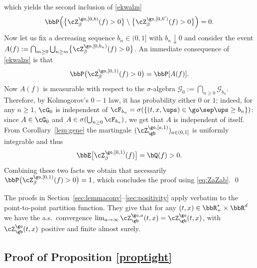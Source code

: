 which yields the second inclusion of \eqref{ekwalzs}
\[
\bbP\Bigl(\bigl\{ \cZ^{\go,[0,b)}_\beta (f)>0 \bigr\} \setminus \bigl\{ \cZ^{\go,[0,b')}_\beta (f) >0 \bigr\} \Bigr) =0.
\]
Now let us fix a decreasing sequence $b_n\in (0,1]$ with $b_n \downarrow 0$ and consider the event $A(f):= \bigcap_{m\ge 0}\bigcup_{n\ge m}\bigl\{ \cZ^{\go,[0,b_n)}_\beta (f) >0 \bigr\} $.
An immediate consequence of \eqref{ekwalzs} is that
\begin{equation}
\bbP\bigl(\cZ^{\go,[0,1)}_\beta (f)>0 \bigr)= \bbP[ A(f) ].
\end{equation}
Now $A(f)$ is measurable with respect to
the $\sigma$-algebra
$\mathcal G_0:=\bigcap_{ n\geq 0}\mathcal G_{ b_n} $. Therefore, by Kolmogorov's $0{-}1$ law, it has probability either $0$ or $1$;
indeed, for any $n\geq 1$, $\cG_0$ is independent of $\cF_{b_n} = \sigma(\{(t,x,\ups) \in \go\sep \ups \geq b_n \})$: since $A\in \cG_0$ and $A \in \sigma(\bigcup_{n\geq 0} \cF_{b_n})$, we get that $A$ is independent of itself.
From Corollary~\ref{lem:gene} the martingale $(\cZ_{\gb}^{\go,[a,1)})_{a\in(0,1]}$
is uniformly integrable and thus
\[
\bbE\bigl[ \cZ^{\go,[0,1)}_\beta (f) \bigr]= \bQ(f)>0.
\]
Combining these two facts we obtain that necessarily $\bbP\bigl(\cZ^{\go,[0,1)}_\beta (f)>0 \bigr)=1$, which concludes the proof using \eqref{eq:ZaZab}.
\qed

\begin{rem}
The proofs in Section~\ref{sec:lemmaconv}--\ref{sec:positivity} apply verbatim to the point-to-point partition function. They give that for any $(t,x)\in \bbR_+^* \times \bbR^d$
we have the a.s.\ convergence $\lim_{a\to\infty} \cZ_{\gb}^{\go,a} (t,x) = \cZ_{\gb}^{\go}(t,x)$,
with $\cZ_{\gb}^{\go}(t,x) $ positive and finite almost surely.
\end{rem}

\subsection{Proof of Proposition \ref{proptight}}
\label{sec:convplus}

